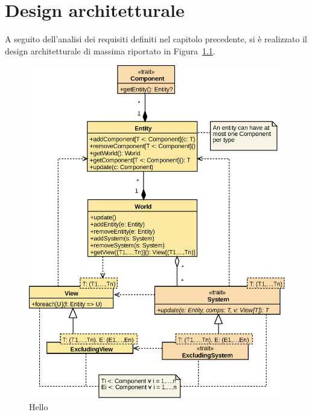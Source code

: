 \chapter{Design architetturale}\label{ch:design-architetturale}
A seguito dell'analisi dei requisiti definiti nel capitolo precedente, si è realizzato il design architetturale
di massima riportato in Figura~\ref{fig:architecture}.

\begin{figure}[H]
    \centering
    \includegraphics[width=\textwidth]{./img/Architechture}
    \caption{Hello}\label{fig:architecture}
\end{figure}

